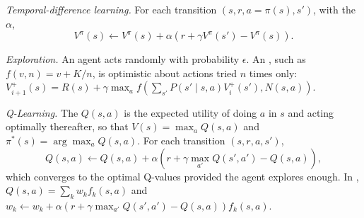 \documentclass[11pt, a4paper]{exam}
\begin{document}
\begin{recap}
    \emph{Temporal-difference learning.} For each transition $(s, r, a = \pi(s), s')$, with the  $\alpha$,
    \[
        V^\pi(s) \leftarrow V^\pi(s) + \alpha (r + \gamma V^\pi(s') - V^\pi(s)).
    \]

    \emph{Exploration.} An  agent acts randomly with probability $\epsilon$. An , such as $f(v, n) = v + K/n$, is optimistic about actions tried $n$ times only: $V^+_{i+1}(s) = R(s) + \gamma \max_a f\left(\sum_{s'} P(s' \mid s, a) V^+_i(s'), N(s, a)\right)$.

    \emph{Q-Learning.} The  $Q(s, a)$ is the expected utility of doing $a$ in $s$ and acting optimally thereafter, so that $V(s) = \max_a Q(s, a)$ and $\pi^*(s) = \arg \max_a Q(s, a)$. For each transition $(s, r, a, s')$,
    \[
        Q(s, a) \leftarrow Q(s, a) + \alpha (r + \gamma \max_{a'} Q(s', a') - Q(s, a)),
    \]
    which converges to the optimal Q-values provided the agent explores enough. In , $Q(s, a) = \sum_k w_k f_k(s, a)$ and $w_k \leftarrow w_k + \alpha (r + \gamma \max_{a'} Q(s', a') - Q(s, a)) f_k(s, a)$.
\end{recap}
\end{document}
